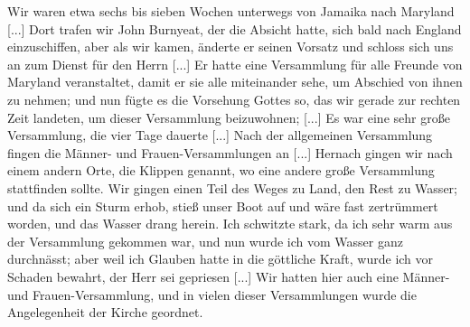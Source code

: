 Wir waren etwa sechs bis sieben Wochen unterwegs von
Jamaika nach Maryland [...] Dort trafen wir John Burnyeat,
der die Absicht hatte, sich bald nach England einzuschiffen, aber
als wir kamen, änderte er seinen Vorsatz und schloss sich uns an
zum Dienst für den Herrn [...] Er hatte eine Versammlung für
alle Freunde von Maryland veranstaltet, damit er sie alle 
miteinander sehe, um Abschied von ihnen zu nehmen; und nun
fügte es die Vorsehung Gottes so, 
das wir gerade zur rechten
Zeit landeten, um dieser Versammlung beizuwohnen; [...] Es
war eine sehr große Versammlung, die vier Tage dauerte [...]
Nach der allgemeinen Versammlung fingen die Männer- und
Frauen-Versammlungen an [...] Hernach gingen wir nach einem
andern Orte, die Klippen genannt, wo eine andere große 
Versammlung stattfinden sollte. Wir gingen einen Teil des Weges
zu Land, den Rest zu Wasser; und da sich ein Sturm erhob, stieß
unser Boot auf und wäre fast zertrümmert worden, und das
Wasser drang herein. Ich schwitzte stark, da ich sehr warm aus
der Versammlung gekommen war, und nun wurde ich vom Wasser
ganz durchnässt; aber weil ich Glauben hatte in die göttliche Kraft,
wurde ich vor Schaden bewahrt, der Herr sei gepriesen [...]
Wir hatten hier auch eine Männer- und Frauen-Versammlung,
und in vielen dieser Versammlungen wurde die Angelegenheit der
Kirche geordnet.

